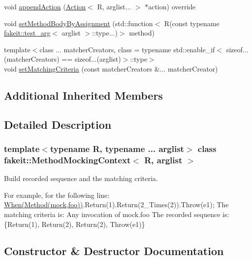 \begin{DoxyCompactItemize}
\item 
void \mbox{\hyperlink{classfakeit_1_1MethodMockingContext_ad413d04564c89fe134dfb7bae1a1f2a1}{append\+Action}} (\mbox{\hyperlink{structfakeit_1_1Action}{Action}}$<$ R, arglist... $>$ $\ast$action) override
\item 
void \mbox{\hyperlink{classfakeit_1_1MethodMockingContext_ade0a1e36946f68957ee3717147122c4d}{set\+Method\+Body\+By\+Assignment}} (std\+::function$<$ R(const typename \mbox{\hyperlink{structfakeit_1_1test__arg}{fakeit\+::test\+\_\+arg}}$<$ arglist $>$\+::type...)$>$ method)
\item 
{\footnotesize template$<$class ... matcher\+Creators, class  = typename std\+::enable\+\_\+if$<$                sizeof...(matcher\+Creators) == sizeof...(arglist)$>$\+::type$>$ }\\void \mbox{\hyperlink{classfakeit_1_1MethodMockingContext_ab6bf85e9f9f5e5eeb2766ec487a42e20}{set\+Matching\+Criteria}} (const matcher\+Creators \&... matcher\+Creator)
\end{DoxyCompactItemize}
\subsection*{Additional Inherited Members}


\subsection{Detailed Description}
\subsubsection*{template$<$typename R, typename ... arglist$>$\newline
class fakeit\+::\+Method\+Mocking\+Context$<$ R, arglist $>$}

Build recorded sequence and the matching criteria. 

For example, for the following line\+: \mbox{\hyperlink{single__header_2tpunit_2fakeit_8hpp_a665d1615d3ae3f21983056f052ab7f24}{When(\+Method(mock,foo))}}.Return(1).Return(2\+\_\+\+Times(2)).Throw(e1); The matching criteria is\+: Any invocation of mock.\+foo The recorded sequence is\+: \{Return(1), Return(2), Return(2), Throw(e1)\} 

\subsection{Constructor \& Destructor Documentation}
\mbox{\label{classfakeit_1_1MethodMockingContext_aa5d0708f0a044fbc8080f64091f8aa71}} 
